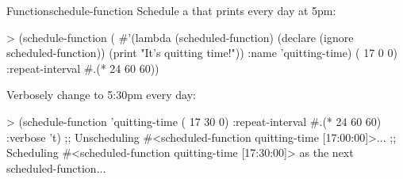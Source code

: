 \documentclass[10pt,twoside,english,pdftex]{article}
\begin{document}
\begin{functiondoc}{Function}{schedule-function}
%
%
Schedule a  that prints  
every day at 5pm:
\begin{example}
> (schedule-function
    (
      #'(lambda (scheduled-function)
          (declare (ignore scheduled-function))
          (print "It's quitting time!"))
      :name 'quitting-time)
     ( 17 0 0) :repeat-interval #.(* 24 60 60))
\end{example}

%
Verbosely change  to 5:30pm every day:
\begin{example}
> (schedule-function 'quitting-time ( 17 30 0)
    :repeat-interval #.(* 24 60 60)
    :verbose 't)
;; Unscheduling #<scheduled-function quitting-time [17:00:00]>...
;; Scheduling #<scheduled-function quitting-time [17:30:00]> 
   as the next scheduled-function...
\end{example}

\end{functiondoc}

\end{document}
